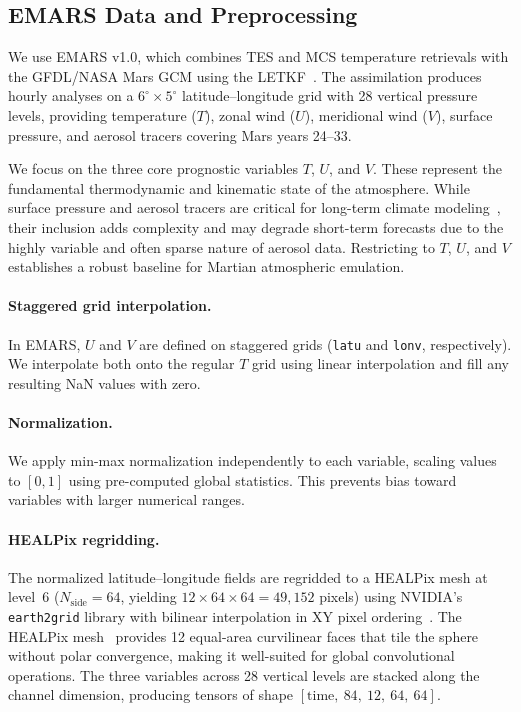 \documentclass[11pt, a4paper, twocolumn]{article}
\begin{document}
\subsection{EMARS Data and Preprocessing}

We use EMARS v1.0, which combines TES and MCS temperature retrievals with the GFDL/NASA Mars GCM using the LETKF~\cite{greybush2019,greybush2012ensemble}. The assimilation produces hourly analyses on a $6^\circ \times 5^\circ$ latitude--longitude grid with 28 vertical pressure levels, providing temperature ($T$), zonal wind ($U$), meridional wind ($V$), surface pressure, and aerosol tracers covering Mars years 24--33.

We focus on the three core prognostic variables $T$, $U$, and $V$. These represent the fundamental thermodynamic and kinematic state of the atmosphere. While surface pressure and aerosol tracers are critical for long-term climate modeling~\cite{montabone2015eight,kahre2017}, their inclusion adds complexity and may degrade short-term forecasts due to the highly variable and often sparse nature of aerosol data. Restricting to $T$, $U$, and $V$ establishes a robust baseline for Martian atmospheric emulation.

\paragraph{Staggered grid interpolation.} In EMARS, $U$ and $V$ are defined on staggered grids (\texttt{latu} and \texttt{lonv}, respectively). We interpolate both onto the regular $T$ grid using linear interpolation and fill any resulting NaN values with zero.

\paragraph{Normalization.} We apply min-max normalization independently to each variable, scaling values to $[0, 1]$ using pre-computed global statistics. This prevents bias toward variables with larger numerical ranges.

\paragraph{HEALPix regridding.} The normalized latitude--longitude fields are regridded to a HEALPix mesh at level~6 ($N_\text{side} = 64$, yielding $12 \times 64 \times 64 = 49{,}152$ pixels) using NVIDIA's \texttt{earth2grid} library with bilinear interpolation in XY pixel ordering~\cite{bonev2023spherical}. The HEALPix mesh~\cite{gorski2005healpix} provides 12 equal-area curvilinear faces that tile the sphere without polar convergence, making it well-suited for global convolutional operations. The three variables across 28 vertical levels are stacked along the channel dimension, producing tensors of shape $[\text{time},\ 84,\ 12,\ 64,\ 64]$.
\end{document}
